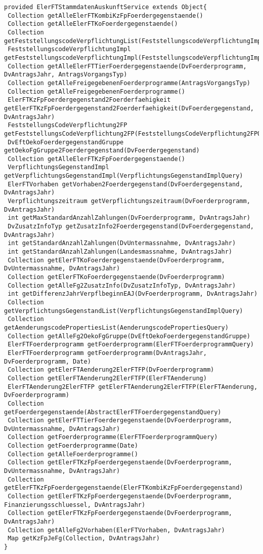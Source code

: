 \begin{lstlisting}[style = dsl, caption = Deklaration von ElerFTStammdatenAuskunftService, captionpos = b, label = lst_eftstd]
provided ElerFTStammdatenAuskunftService extends Object{
 Collection getAlleElerFTKombiKzFpFoerdergegenstaende()
 Collection getAlleElerFTKoFoerdergegenstaende()
 Collection getFeststellungscodeVerpflichtungList(FeststellungscodeVerpflichtungImplQuery)
 FeststellungscodeVerpflichtungImpl getFeststellungscodeVerpflichtungImpl(FeststellungscodeVerpflichtungImplQuery)
 Collection getAlleElerFTTierFoerdergegenstaende(DvFoerderprogramm, DvAntragsJahr, AntragsVorgangsTyp)
 Collection getAlleFreigegebenenFoerderprogramme(AntragsVorgangsTyp)
 Collection getAlleFreigegebenenFoerderprogramme()
 ElerFTKzFpFoerdergegenstand2Foerderfaehigkeit getElerFTKzFpFoerdergegenstand2Foerderfaehigkeit(DvFoerdergegenstand, DvAntragsJahr)
 FeststellungsCodeVerpflichtung2FP getFeststellungsCodeVerpflichtung2FP(FeststellungsCodeVerpflichtung2FPQuery)
 DvEftOekoFoerdergegenstandGruppe getOekoFgGruppe2Foerdergegenstand(DvFoerdergegenstand)
 Collection getAlleElerFTKzFpFoerdergegenstaende()
 VerpflichtungsGegenstandImpl getVerpflichtungsGegenstandImpl(VerpflichtungsGegenstandImplQuery)
 ElerFTVorhaben getVorhaben2Foerdergegenstand(DvFoerdergegenstand, DvAntragsJahr)
 Verpflichtungszeitraum getVerpflichtungszeitraum(DvFoerderprogramm, DvAntragsJahr)
 int getMaxStandardAnzahlZahlungen(DvFoerderprogramm, DvAntragsJahr)
 DvZusatzInfoTyp getZusatzInfo2Foerdergegenstand(DvFoerdergegenstand, DvAntragsJahr)
 int getStandardAnzahlZahlungen(DvUntermassnahme, DvAntragsJahr)
 int getStandardAnzahlZahlungen(Landesmassnahme, DvAntragsJahr)
 Collection getElerFTKoFoerdergegenstaende(DvFoerderprogramm, DvUntermassnahme, DvAntragsJahr)
 Collection getElerFTKoFoerdergegenstaende(DvFoerderprogramm)
 Collection getAlleFg2ZusatzInfo(DvZusatzInfoTyp, DvAntragsJahr)
 int getDifferenzJahrVerpflbeginnEAJ(DvFoerderprogramm, DvAntragsJahr)
 Collection getVerpflichtungsGegenstandList(VerpflichtungsGegenstandImplQuery)
 Collection getAenderungscodePropertiesList(AenderungscodePropertiesQuery)
 Collection getAlleFg2OekoFgGruppe(DvEftOekoFoerdergegenstandGruppe)
 ElerFTFoerderprogramm getFoerderprogramm(ElerFTFoerderprogrammQuery)
 ElerFTFoerderprogramm getFoerderprogramm(DvAntragsJahr, DvFoerderprogramm, Date)
 Collection getElerFTAenderung2ElerFTFP(DvFoerderprogramm)
 Collection getElerFTAenderung2ElerFTFP(ElerFTAenderung)
 ElerFTAenderung2ElerFTFP getElerFTAenderung2ElerFTFP(ElerFTAenderung, DvFoerderprogramm)
 Collection getFoerdergegenstaende(AbstractElerFTFoerdergegenstandQuery)
 Collection getElerFTTierFoerdergegenstaende(DvFoerderprogramm, DvUntermassnahme, DvAntragsJahr)
 Collection getFoerderprogramme(ElerFTFoerderprogrammQuery)
 Collection getFoerderprogramme(Date)
 Collection getAlleFoerderprogramme()
 Collection getElerFTKzFpFoerdergegenstaende(DvFoerderprogramm, DvUntermassnahme, DvAntragsJahr)
 Collection getElerFTKzFpFoerdergegenstaende(ElerFTKombiKzFpFoerdergegenstand)
 Collection getElerFTKzFpFoerdergegenstaende(DvFoerderprogramm, Finanzierungsschluessel, DvAntragsJahr)
 Collection getElerFTKzFpFoerdergegenstaende(DvFoerderprogramm, DvAntragsJahr)
 Collection getAlleFg2Vorhaben(ElerFTVorhaben, DvAntragsJahr)
 Map getKzFpJeFg(Collection, DvAntragsJahr)
}
\end{lstlisting}

